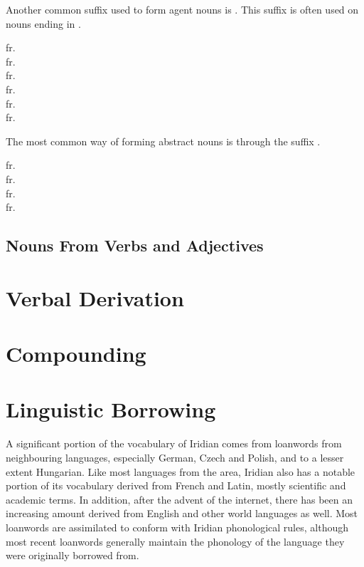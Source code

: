 Another common suffix used to form agent nouns is . This suffix is often used on nouns ending in .

\ex
{} fr. \\
 fr. \\
 fr. \\
 fr. \\
 fr. \\
 fr. 
\xe

The most common way of forming abstract nouns is through the suffix .

\ex
{} fr. \\
 fr. \\
 fr. \\
 fr. 
\xe


\subsection{Nouns From Verbs and Adjectives}



\section{Verbal Derivation}

\section{Compounding}

\section{Linguistic Borrowing}
A significant portion of the vocabulary of Iridian comes from loanwords from neighbouring languages, especially German, Czech and Polish, and to a lesser extent Hungarian. Like most languages from the area, Iridian also has a notable portion of its vocabulary derived from French and Latin, mostly scientific and academic terms. In addition, after the advent of the internet, there has been an increasing amount derived from English and other world languages as well. Most loanwords are assimilated to conform with Iridian phonological rules, although most recent loanwords generally maintain the phonology of the language they were originally borrowed from.

